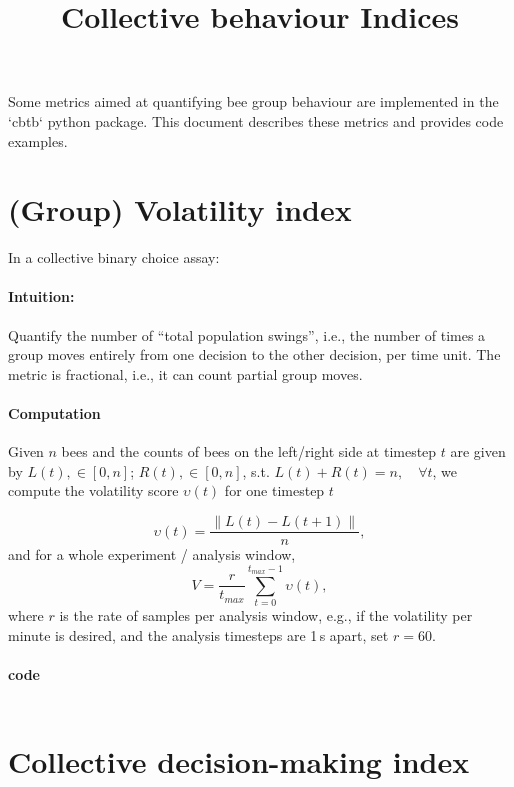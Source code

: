 \documentclass{article}
\title{Collective behaviour Indices}
\date{}%
\newcommand{\scare}[1]{``#1''}
\begin{document}
\maketitle

\noindent Some metrics aimed at quantifying bee group behaviour are implemented in the `cbtb` python package.  This document describes these metrics and provides code examples. 

\section{(Group) Volatility index}

In a collective binary choice assay:

\paragraph*{Intuition:} Quantify the number of \scare{total population swings}, i.e., the number of times a group moves entirely from one decision to the other decision, per time unit.  The metric is fractional, i.e., it can count partial group moves.

\paragraph{Computation}
Given $n$ bees and the counts of bees on the left/right side at timestep $t$ are given by $L(t), \in [0,n]$; $R(t), \in [0,n]$, s.t. $L(t) + R(t) = n, \quad \forall t$, we compute the volatility score $\upsilon(t)$ for one timestep $t$

\begin{equation}
	\upsilon(t) = \frac{\|L(t) - L(t+1) \|}{n},
\end{equation}
and for a whole experiment / analysis window,
\begin{equation}
	V = \frac{r}{t_{max}}\sum_{t=0}^{t_{max}-1} \upsilon(t),
\end{equation}
where $r$ is the rate of samples per analysis window, e.g., if the volatility per minute is desired, and the analysis timesteps are  1$\,$s apart, set $r=60$.

\paragraph{code}
\inputminted{python}{volatility_index_eg.py}

\clearpage
\section{Collective decision-making index}
\end{document}
